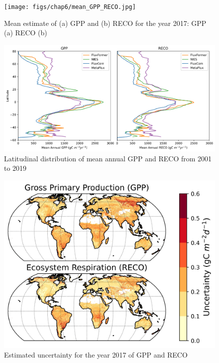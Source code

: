 \begin{figure}[tbh!]
    \centering
    \texttt{[image: figs/chap6/mean\_GPP\_RECO.jpg]}
    \caption[Mean estimate of GPP and RECO in 2017]{Mean estimate of (a) GPP and (b) RECO for the year 2017: GPP (a) RECO (b)}
    \label{fig:chap6_fig2}
\end{figure}
\begin{figure}[h!]
  \centering
  \includegraphics[width=\textwidth]{figs/chap6/lat_mean.jpg}
  \caption[Latitudinal distribution of mean annual GPP and RECO]{Latitudinal distribution of mean annual GPP and RECO from 2001 to 2019}
  \label{fig:chap6_fig_lat_mean}
\end{figure}
\begin{figure}[h!]
  \centering
  \includegraphics[width=\textwidth]{figs/chap6/uncertainty.jpg}
  \caption{Estimated uncertainty for the year 2017 of GPP and RECO}
  \label{fig:chap6_fig_std}
\end{figure}

